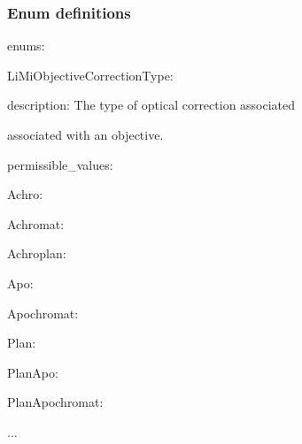 \begin{frame}
  \frametitle{Enum definitions}

\begin{semiverbatim}
enums:

\hspace{1em}LiMiObjectiveCorrectionType:

\hspace{2em}description: The type of optical correction associated

\hspace{3em}associated with an objective.

\hspace{2em}permissible\_values:

\hspace{3em}Achro:

\hspace{3em}Achromat:

\hspace{3em}Achroplan:

\hspace{3em}Apo:

\hspace{3em}Apochromat:

\hspace{3em}Plan:

\hspace{3em}PlanApo:

\hspace{3em}PlanApochromat:

\hspace{3em}...
\end{semiverbatim}
\end{frame}


